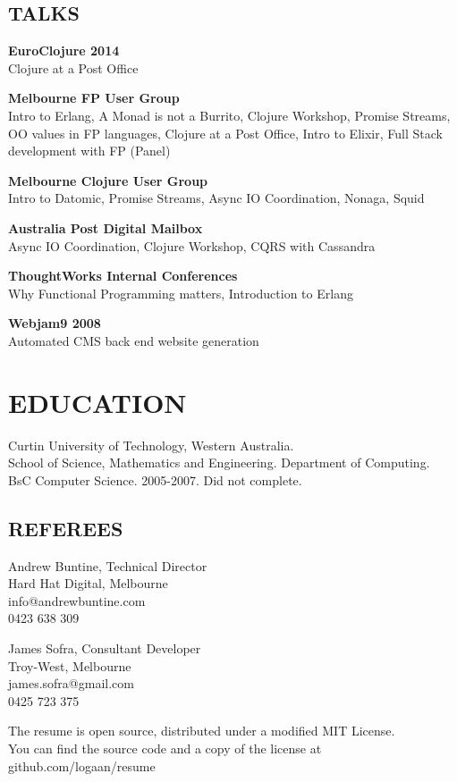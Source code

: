 \documentclass[margin]{res}
\begin{document}
\begin{resume}

  \begin{multicols}{2}
    \section{TALKS}
    \textbf{EuroClojure 2014} \\
    Clojure at a Post Office

    \textbf{Melbourne FP User Group} \\
    Intro to Erlang, A Monad is not a Burrito, Clojure Workshop, Promise
    Streams, OO values in FP languages, Clojure at a Post Office, Intro to
    Elixir, Full Stack development with FP (Panel)

    \textbf{Melbourne Clojure User Group} \\
    Intro to Datomic, Promise Streams, Async IO Coordination, Nonaga, Squid

    \columnbreak

    \textbf{Australia Post Digital Mailbox} \\
    Async IO Coordination, Clojure Workshop, CQRS with Cassandra

    \textbf{ThoughtWorks Internal Conferences} \\
    Why Functional Programming matters, Introduction to Erlang

    \textbf{Webjam9 2008} \\
    Automated CMS back end website generation
  \end{multicols}

  \section{EDUCATION}
  Curtin University of Technology, Western Australia. \\
  School of Science, Mathematics and
  Engineering. Department of Computing. \\
  BsC Computer Science. 2005-2007. Did not complete.

  \begin{multicols}{2}
    \section{REFEREES}
    Andrew Buntine, Technical Director \\
    Hard Hat Digital, Melbourne \\
    info@andrewbuntine.com \\
    0423 638 309

    James Sofra, Consultant Developer \\
    Troy-West, Melbourne \\
    james.sofra@gmail.com \\
    0425 723 375
  \end{multicols}

\end{resume} 

\centering
\hspace{-1.75in} The resume is open source, distributed under a modified MIT
License. \\
\hspace{-1.75in} You can find the source code and a copy of the license at
github.com/logaan/resume
\end{document}
